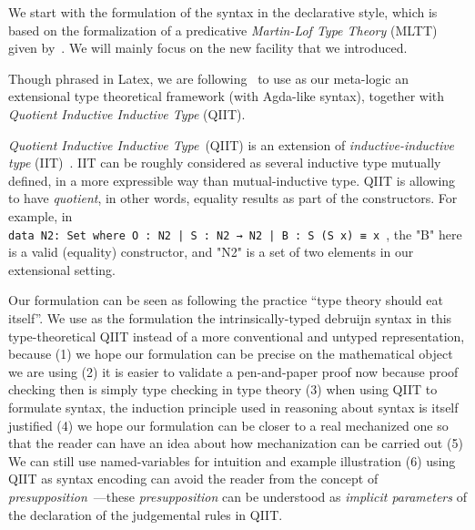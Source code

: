 We start with the formulation of the syntax in the declarative style, which is based on the
formalization of a predicative \textit{Martin-Lof Type Theory} (MLTT)~\cite{martin1982constructive}
given by~\citet{coquand2018canonicity}.
We will mainly focus on the new facility that we introduced.

Though phrased in Latex, we are following~\citet{altkap2016} to use as
our meta-logic an extensional type theoretical framework (with Agda-like syntax), 
together with \textit{Quotient Inductive Inductive Type} (QIIT). 

\textit{Quotient Inductive Inductive Type}~(QIIT) is an extension of \textit{inductive-inductive type} (IIT)~\cite{nordvall2010inductive}. IIT can be roughly considered as several inductive type mutually defined, in a more expressible way than mutual-inductive type. QIIT is allowing to have \textit{quotient}, in other words, equality results as part of the constructors. For example, in \\ \texttt{data N2: Set where O : N2 | S : N2 → N2 | B : S (S x) ≡ x }, the "B" here is a valid (equality) constructor, and "N2" is a set of two elements in our extensional setting.

Our formulation can be seen as following the practice ``type theory should eat itself''\cite{dybjer1995internal, chapman2009type}. We use as the formulation the intrinsically-typed debruijn syntax in this type-theoretical QIIT instead of a more conventional and untyped representation, because (1) we hope our formulation can be precise on the mathematical object we are using (2) it is easier to validate a pen-and-paper proof now because proof checking then is simply type checking in type theory (3) when using QIIT to formulate syntax, the induction principle used in reasoning about syntax is itself justified (4) we hope our formulation can be closer to a real mechanized one so that the reader can have an idea about how mechanization can be carried out (5) We can still use named-variables for intuition and example illustration (6) using QIIT as syntax encoding can avoid the reader from the concept of \textit{presupposition}~\cite{gratzer-sterling-birkedal-2019}---these \textit{presupposition} can be understood as \textit{implicit parameters} of the declaration of the judgemental rules in QIIT.


